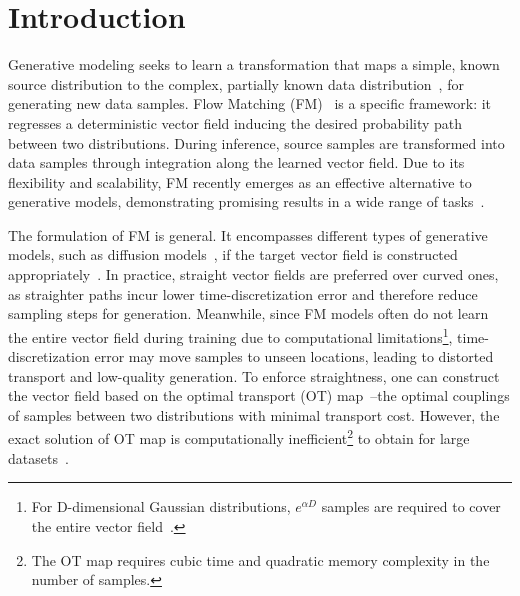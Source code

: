 \section{Introduction}
\renewcommand{\thefootnote}{}
\renewcommand{\thefootnote}{\arabic{footnote}}
\setcounter{footnote}{0}

Generative modeling seeks to learn a transformation that maps a simple, known source distribution to the complex, partially known data distribution~\cite{kingma2013auto, rezende2015variational, sohl2015deep, song2019generative, ho2020denoising, song2020score}, for generating new data samples.  Flow Matching (FM)~\cite{lipman2022flow,albergo2022building} is a specific framework: it regresses a deterministic vector field inducing the desired probability path between two distributions.  During inference, source samples are transformed into data samples through integration along the learned vector field.  Due to its flexibility and scalability, FM recently emerges as an effective alternative to generative models, demonstrating promising results in a wide range of tasks~\cite{tong2020trajectorynet,liu2023instaflow,black2024pi_0}.

The formulation of FM is general.  It encompasses different types of generative models, such as diffusion models~\cite{song2020score,ho2020denoising}, if the target vector field is constructed appropriately~\cite{lipman2022flow}.  In practice, straight vector fields are preferred over curved ones, as straighter paths incur lower time-discretization error and therefore reduce sampling steps for generation.  Meanwhile, since FM models often do not learn the entire vector field during training due to computational limitations\footnote{For D-dimensional Gaussian distributions, $e^{\alpha D}$ samples are required to cover the entire vector field~\cite{vershynin2018high}.}, time-discretization error may move samples to unseen locations, leading to distorted transport and low-quality generation.  To enforce straightness, one can construct the vector field based on the optimal transport (OT) map~\cite{benamou2000computational}--the optimal couplings of samples between two distributions with minimal transport cost.  However, the exact solution of OT map is computationally inefficient\footnote{The OT map requires cubic time and quadratic memory complexity in the number of samples.} to obtain for large datasets~\cite{cuturi2013sinkhorn,tong2020trajectorynet}.

